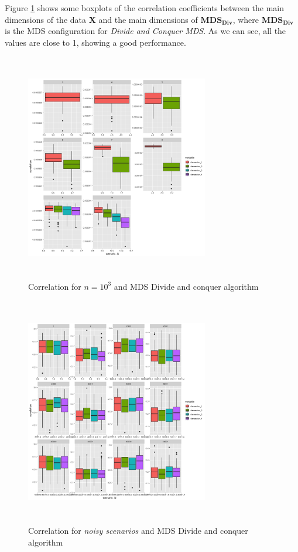 \documentclass[11pt]{report}
\begin{document}
\indent Figure \ref{divide_correlation_1000} shows some boxplots of the 
correlation coefficients between the main dimensions of the data \textbf{X} 
and the main dimensions of $\mathbf{MDS_{Div}}$, where  $\mathbf{MDS_{Div}}$ is
the MDS configuration for \textit{Divide and Conquer MDS}. As we can see, 
all the values are close to 1, showing a good performance. 


\begin{figure}[!h]
\centering
    \includegraphics[width=8cm, height=10cm]{./images/divide_correlation_1000.png}
    \caption{Correlation for $n = 10^3$ and MDS Divide and conquer algorithm}
    \label{divide_correlation_1000}
\end{figure}

\begin{figure}[!h]
\centering
    \includegraphics[width=8cm, height=10cm]{./images/divide_correlation_noise.png}
    \caption{Correlation for \textit{noisy scenarios} and MDS Divide and conquer algorithm}
    \label{divide_correlation_noise}
\end{figure}
\end{document}
